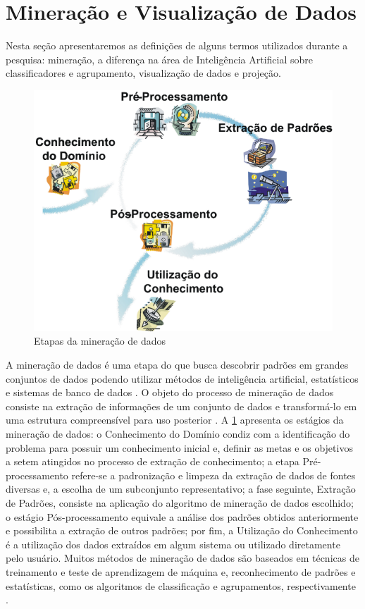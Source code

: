 	\section{Mineração e Visualização de Dados}
	\label{sec:FundTeor}
		Nesta seção apresentaremos as definições de alguns termos utilizados
		durante a pesquisa: mineração, a diferença na área de Inteligência
		Artificial sobre classificadores e agrupamento, visualização de dados e projeção.

		\begin{figure}[h]
			\centering
			\includegraphics[width=0.7\linewidth]{imagem/mineracaoDados}
			\captionsetup{justification=centering}
			\caption[Etapas da mineração de dados]{Etapas da mineração de dados \cite{rezende2003}}
			\label{fig:mineracaoDados}
		\end{figure}
		
		A mineração de dados é uma etapa do 
		\cite{fayyad1996} que busca descobrir padrões em grandes conjuntos de dados
		podendo utilizar métodos de inteligência artificial, estatísticos e sistemas
		de banco de dados \cite{chakrabarti2006}. O objeto do processo de mineração
		de dados consiste na extração de informações de um conjunto de dados e
		transformá-lo em uma estrutura compreensível para uso posterior \cite{chakrabarti2006}.
		A \cref{fig:mineracaoDados} apresenta os estágios da mineração de dados:
		o Conhecimento do Domínio condiz com a identificação do problema para possuir
		um conhecimento inicial e, definir as metas e os objetivos a setem atingidos
		no processo de extração de conhecimento; a etapa Pré-processamento refere-se
		a padronização e limpeza da extração de dados de fontes diversas e, a escolha
		de um subconjunto representativo; a fase seguinte, Extração de Padrões, 
		consiste na aplicação do algoritmo de mineração de dados escolhido; o estágio
		Pós-processamento equivale a análise dos padrões obtidos anteriormente e
		possibilita a extração de outros padrões; por fim, a Utilização do Conhecimento
		é a utilização dos dados extraídos em algum sistema ou utilizado diretamente
		pelo usuário. Muitos métodos de mineração de dados são baseados em técnicas de treinamento
		e teste de aprendizagem de máquina e, reconhecimento de padrões e estatísticas,
		como os algoritmos de classificação e agrupamentos, respectivamente \cite{fayyad1996}.
		
